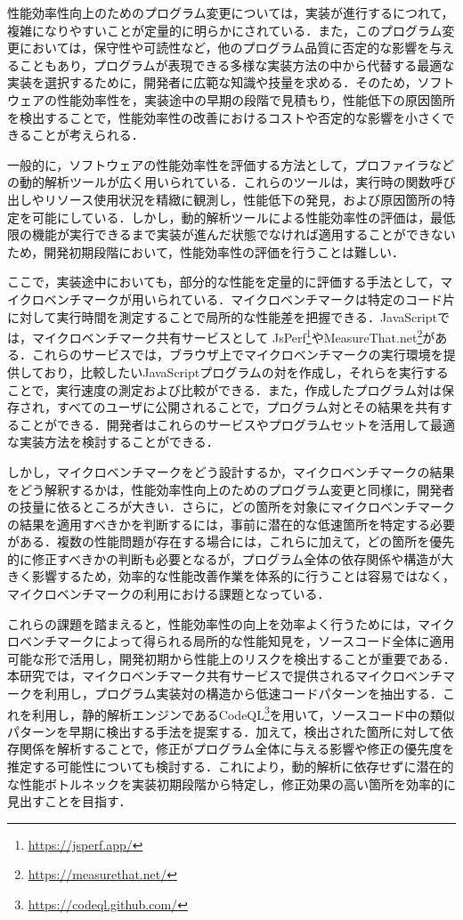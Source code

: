 \documentclass[submit,techrep,noauthor]{ipsj}
\begin{document}
性能効率性向上のためのプログラム変更については，実装が進行するにつれて，複雑になりやすいことが定量的に明らかにされている\cite{complicate}．また，このプログラム変更においては，保守性や可読性など，他のプログラム品質に否定的な影響を与えることもあり\cite{negative}，プログラムが表現できる多様な実装方法の中から代替する最適な実装を選択するために，開発者に広範な知識や技量を求める．そのため，ソフトウェアの性能効率性を，実装途中の早期の段階で見積もり，性能低下の原因箇所を検出することで，性能効率性の改善におけるコストや否定的な影響を小さくできることが考えられる． 

一般的に，ソフトウェアの性能効率性を評価する方法として，プロファイラなどの動的解析ツールが広く用いられている．これらのツールは，実行時の関数呼び出しやリソース使用状況を精緻に観測し，性能低下の発見，および原因箇所の特定を可能にしている．しかし，動的解析ツールによる性能効率性の評価は，最低限の機能が実行できるまで実装が進んだ状態でなければ適用することができないため，開発初期段階において，性能効率性の評価を行うことは難しい．

ここで，実装途中においても，部分的な性能を定量的に評価する手法として，マイクロベンチマークが用いられている．マイクロベンチマークは特定のコード片に対して実行時間を測定することで局所的な性能差を把握できる．JavaScriptでは，マイクロベンチマーク共有サービスとして JsPerf\footnote{\url{https://jsperf.app/}}やMeasureThat.net\footnote{\url{https://measurethat.net/}}がある．これらのサービスでは，ブラウザ上でマイクロベンチマークの実行環境を提供しており，比較したいJavaScriptプログラムの対を作成し，それらを実行することで，実行速度の測定および比較ができる．また，作成したプログラム対は保存され，すべてのユーザに公開されることで，プログラム対とその結果を共有することができる．開発者はこれらのサービスやプログラムセットを活用して最適な実装方法を検討することができる．

しかし，マイクロベンチマークをどう設計するか，マイクロベンチマークの結果をどう解釈するかは，性能効率性向上のためのプログラム変更と同様に，開発者の技量に依るところが大きい．さらに，どの箇所を対象にマイクロベンチマークの結果を適用すべきかを判断するには，事前に潜在的な低速箇所を特定する必要がある．複数の性能問題が存在する場合には，これらに加えて，どの箇所を優先的に修正すべきかの判断も必要となるが，プログラム全体の依存関係や構造が大きく影響するため，効率的な性能改善作業を体系的に行うことは容易ではなく，マイクロベンチマークの利用における課題となっている．

これらの課題を踏まえると，性能効率性の向上を効率よく行うためには，マイクロベンチマークによって得られる局所的な性能知見を，ソースコード全体に適用可能な形で活用し，開発初期から性能上のリスクを検出することが重要である．本研究では，マイクロベンチマーク共有サービスで提供されるマイクロベンチマークを利用し，プログラム実装対の構造から低速コードパターンを抽出する．これを利用し，静的解析エンジンであるCodeQL\footnote{\url{https://codeql.github.com/}}\cite{ql}を用いて，ソースコード中の類似パターンを早期に検出する手法を提案する．加えて，検出された箇所に対して依存関係を解析することで，修正がプログラム全体に与える影響や修正の優先度を推定する可能性についても検討する．これにより，動的解析に依存せずに潜在的な性能ボトルネックを実装初期段階から特定し，修正効果の高い箇所を効率的に見出すことを目指す．
\end{document}

